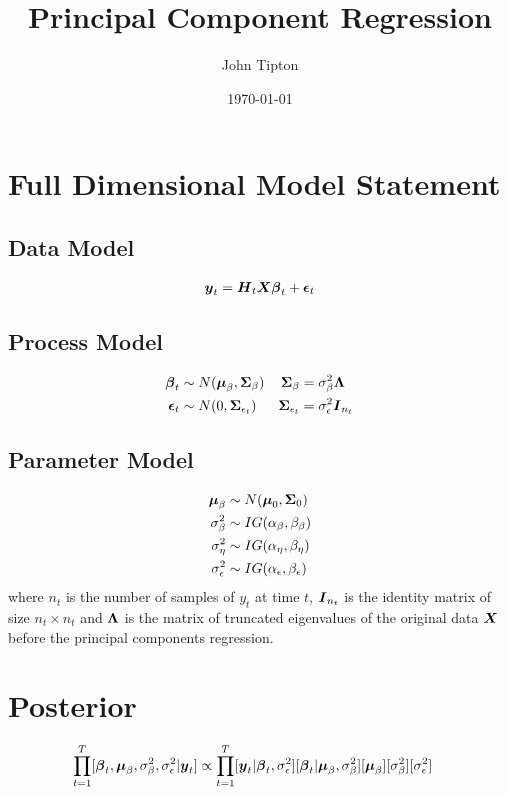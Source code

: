 \documentclass[fleqn]{article}
\title{Principal Component Regression}
\author{John Tipton}
\date{\today}
\def\bm#1{\mbox{\boldmath $#1$}}
\begin{document}
\maketitle

\section{Full Dimensional Model Statement}
%
\subsection{Data Model}
\begin{align*}
%
\bm{y}_t & = \bm{H}_t \bm{X} \bm{\beta}_t + \bm{\epsilon}_t\\
%
\end{align*}
%
\subsection{Process Model}
%
\begin{align*}
%
\bm{\beta}_t & \sim N(\bm{\mu}_\beta, \bm{\Sigma}_\beta) & \bm{\Sigma}_\beta &  = \sigma^2_\beta \bm{\Lambda}\\
%
\bm{\epsilon}_t & \sim N(0, \bm{\Sigma}_{\epsilon_t}) & \bm{\Sigma}_{\epsilon_t} &  = \sigma^2_\epsilon \bm{I}_{n_t}\\
%
\end{align*}
%
\subsection{Parameter Model}
%
\begin{align*}
%
\bm{\mu}_\beta & \sim N(\bm{\mu}_0, \bm{\Sigma}_0)\\
%
\sigma^2_\beta & \sim IG(\alpha_\beta, \beta_\beta)\\
%
\sigma^2_\eta & \sim IG(\alpha_\eta, \beta_\eta)\\
%
\sigma^2_\epsilon & \sim IG(\alpha_\epsilon, \beta_\epsilon)\\
%
\end{align*}
%
where $n_t$ is the number of samples of $y_t$ at time $t$, $\bm{I}_{n_t}$ is the identity matrix of size $n_t \times n_t$ and $\bm{\Lambda}$ is the matrix of truncated eigenvalues of the original data $\bm{X}$ before the principal components regression.
%
\section{Posterior}
%
\begin{align*}
\prod_{t = 1}^T [\bm{\beta}_t, \bm{\mu}_\beta, \sigma^2_\beta, \sigma^2_\epsilon | \bm{y}_t] & \propto \prod_{t = 1}^T [\bm{y}_t | \bm{\beta}_t, \sigma^2_\epsilon] [\bm{\beta}_t | \bm{\mu}_\beta, \sigma^2_\beta] [\bm{\mu}_\beta] [\sigma^2_\beta] [\sigma^2_\epsilon] 
\end{align*}
%
\end{document}
